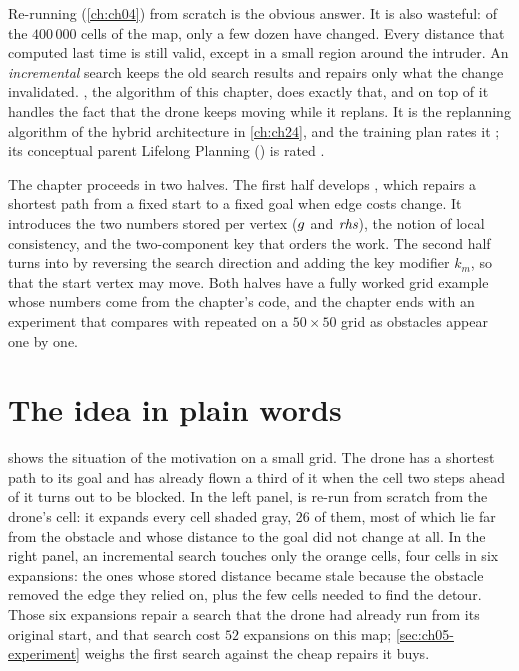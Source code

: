 Re-running \astar (\cref{ch:ch04}) from scratch is the obvious answer. It is also
wasteful: of the $400\,000$ cells of the map, only a few dozen have changed. Every
distance that \astar computed last time is still valid, except in a small region around
the intruder. An \emph{incremental} search keeps the old search results and repairs only
what the change invalidated. \dstarlite, the algorithm of this chapter, does exactly
that, and on top of it handles the fact that the drone keeps moving while it replans.
It is the replanning algorithm of the hybrid architecture in \cref{ch:ch24}, and the
training plan rates it ; its conceptual parent Lifelong Planning
\astar (\lpastar) is rated
.

The chapter proceeds in two halves. The first half develops \lpastar, which repairs a
shortest path from a fixed start to a fixed goal when edge costs change. It introduces
the two numbers stored per vertex ($g$ and $\mathit{rhs}$), the notion of local consistency,
and the two-component key that orders the work. The second half turns \lpastar into
\dstarlite by reversing the search direction and adding the key modifier $k_m$, so that
the start vertex may move. Both halves have a fully worked grid example whose numbers
come from the chapter's \python code, and the chapter ends with an experiment that
compares \dstarlite with repeated \astar on a $50 \times 50$ grid as obstacles appear
one by one.

\section{The idea in plain words}
\label{sec:ch05-intuition}

 shows the situation of the motivation on a small grid. The drone
has a shortest path to its goal and has already flown a third of it when the cell two
steps ahead of it turns out to be blocked. In the left panel, \astar is re-run from
scratch from the drone's cell: it expands every cell shaded gray, $26$ of them, most of
which lie far from the obstacle and whose distance to the goal did not change at all.
In the right panel, an incremental search touches only the orange cells, four cells in
six expansions: the ones whose stored distance became stale because the obstacle removed
the edge they relied on, plus the few cells needed to find the detour. Those six
expansions repair a search that the drone had already run from its original start, and
that search cost $52$ expansions on this map; \cref{sec:ch05-experiment} weighs the
first search against the cheap repairs it buys.

